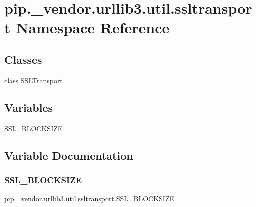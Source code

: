 \hypertarget{namespacepip_1_1__vendor_1_1urllib3_1_1util_1_1ssltransport}{}\section{pip.\+\_\+vendor.\+urllib3.\+util.\+ssltransport Namespace Reference}
\label{namespacepip_1_1__vendor_1_1urllib3_1_1util_1_1ssltransport}
\subsection*{Classes}
\begin{DoxyCompactItemize}
\item 
class \hyperlink{classpip_1_1__vendor_1_1urllib3_1_1util_1_1ssltransport_1_1SSLTransport}{S\+S\+L\+Transport}
\end{DoxyCompactItemize}
\subsection*{Variables}
\begin{DoxyCompactItemize}
\item 
\hyperlink{namespacepip_1_1__vendor_1_1urllib3_1_1util_1_1ssltransport_a79d481a497ba3030e7b371ac6d65a071}{S\+S\+L\+\_\+\+B\+L\+O\+C\+K\+S\+I\+ZE}
\end{DoxyCompactItemize}


\subsection{Variable Documentation}
\mbox{\label{namespacepip_1_1__vendor_1_1urllib3_1_1util_1_1ssltransport_a79d481a497ba3030e7b371ac6d65a071}} 
\subsubsection{\texorpdfstring{S\+S\+L\+\_\+\+B\+L\+O\+C\+K\+S\+I\+ZE}{SSL\_BLOCKSIZE}}
{\footnotesize\ttfamily pip.\+\_\+vendor.\+urllib3.\+util.\+ssltransport.\+S\+S\+L\+\_\+\+B\+L\+O\+C\+K\+S\+I\+ZE}

